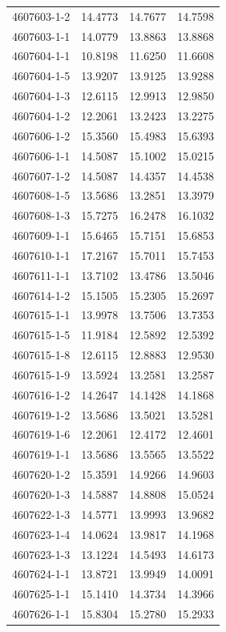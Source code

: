 \begin{longtable}{lrrr}
4607603-1-2 & 14.4773 & 14.7677 & 14.7598 \\
4607603-1-1 & 14.0779 & 13.8863 & 13.8868 \\
4607604-1-1 & 10.8198 & 11.6250 & 11.6608 \\
4607604-1-5 & 13.9207 & 13.9125 & 13.9288 \\
4607604-1-3 & 12.6115 & 12.9913 & 12.9850 \\
4607604-1-2 & 12.2061 & 13.2423 & 13.2275 \\
4607606-1-2 & 15.3560 & 15.4983 & 15.6393 \\
4607606-1-1 & 14.5087 & 15.1002 & 15.0215 \\
4607607-1-2 & 14.5087 & 14.4357 & 14.4538 \\
4607608-1-5 & 13.5686 & 13.2851 & 13.3979 \\
4607608-1-3 & 15.7275 & 16.2478 & 16.1032 \\
4607609-1-1 & 15.6465 & 15.7151 & 15.6853 \\
4607610-1-1 & 17.2167 & 15.7011 & 15.7453 \\
4607611-1-1 & 13.7102 & 13.4786 & 13.5046 \\
4607614-1-2 & 15.1505 & 15.2305 & 15.2697 \\
4607615-1-1 & 13.9978 & 13.7506 & 13.7353 \\
4607615-1-5 & 11.9184 & 12.5892 & 12.5392 \\
4607615-1-8 & 12.6115 & 12.8883 & 12.9530 \\
4607615-1-9 & 13.5924 & 13.2581 & 13.2587 \\
4607616-1-2 & 14.2647 & 14.1428 & 14.1868 \\
4607619-1-2 & 13.5686 & 13.5021 & 13.5281 \\
4607619-1-6 & 12.2061 & 12.4172 & 12.4601 \\
4607619-1-1 & 13.5686 & 13.5565 & 13.5522 \\
4607620-1-2 & 15.3591 & 14.9266 & 14.9603 \\
4607620-1-3 & 14.5887 & 14.8808 & 15.0524 \\
4607622-1-3 & 14.5771 & 13.9993 & 13.9682 \\
4607623-1-4 & 14.0624 & 13.9817 & 14.1968 \\
4607623-1-3 & 13.1224 & 14.5493 & 14.6173 \\
4607624-1-1 & 13.8721 & 13.9949 & 14.0091 \\
4607625-1-1 & 15.1410 & 14.3734 & 14.3966 \\
4607626-1-1 & 15.8304 & 15.2780 & 15.2933 \\

\end{longtable}
